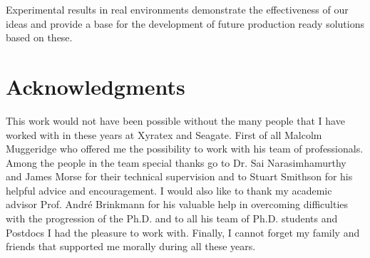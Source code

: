 \documentclass[a4paper,titlepage,oneside,11pt]{book}
\begin{document}
Experimental results in real environments demonstrate the effectiveness of our ideas and provide a base for the development of future production ready solutions based on these.

\chapter*{Acknowledgments}
This work would not have been possible without the many people that I have worked with in these years at Xyratex and Seagate. First of all Malcolm Muggeridge who offered me the possibility to work with his team of professionals.
Among the people in the team special thanks go to Dr. Sai Narasimhamurthy and James Morse for their technical supervision and to Stuart Smithson for his helpful advice and encouragement. I would also like to thank my academic advisor 
Prof. Andr\'e Brinkmann for his valuable help in overcoming difficulties with the progression of the Ph.D. and to all his team of Ph.D. students and Postdocs I had the pleasure to work with. Finally, I cannot forget my family and friends 
that supported me morally during all these years.

\listoffigures
\cleardoublepage

\listoftables
\cleardoublepage

\tableofcontents
\mainmatter


\newpage
{}\setcounter{page}{1}






\cleardoublepage
\end{document}
